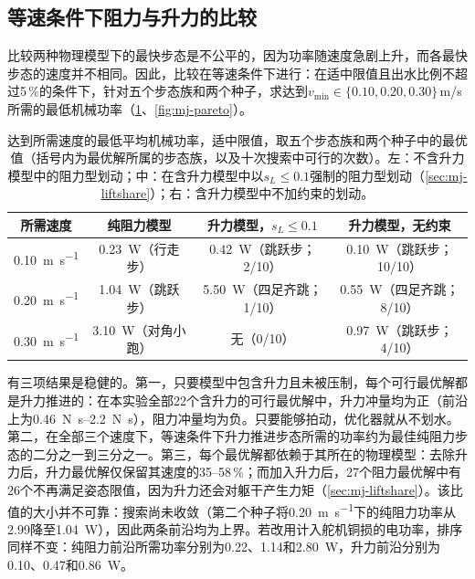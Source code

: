 \subsection{等速条件下阻力与升力的比较}

比较两种物理模型下的最快步态是不公平的，因为功率随速度急剧上升，而各最快步态的速度并不相同。因此，比较在等速条件下进行：在适中限值且出水比例不超过5\,\%的条件下，针对五个步态族和两个种子，求达到$v_\text{min}\in\{0.10,0.20,0.30\}$\,m/s所需的最低机械功率（\cref{tab:mj-pareto}、\cref{fig:mj-pareto}）。

\begin{table}[t]
  \centering
  \caption[等速下的最低功率：阻力与升力对比]{达到所需速度的最低平均机械功率，适中限值，取五个步态族和两个种子中的最优值（括号内为最优解所属的步态族，以及十次搜索中可行的次数）。左：不含升力模型中的阻力型划动；中：在含升力模型中以$s_L\le0.1$强制的阻力型划动（\cref{sec:mj-liftshare}）；右：含升力模型中不加约束的划动。}
  \label{tab:mj-pareto}
  \small
  \begin{tabular}{@{}cccc@{}}
    \toprule
    所需速度 & 纯阻力模型 & 升力模型，$s_L\le0.1$ & 升力模型，无约束 \\
    \midrule
    \SI{0.10}{\metre\per\second} & \SI{0.23}{\watt}（行走步） & \SI{0.42}{\watt}（跳跃步；2/10） & \SI{0.10}{\watt}（跳跃步；10/10） \\
    \SI{0.20}{\metre\per\second} & \SI{1.04}{\watt}（跳跃步） & \SI{5.50}{\watt}（四足齐跳；1/10） & \SI{0.55}{\watt}（四足齐跳；8/10） \\
    \SI{0.30}{\metre\per\second} & \SI{3.10}{\watt}（对角小跑） & 无（0/10） & \SI{0.97}{\watt}（跳跃步；4/10） \\
    \bottomrule
  \end{tabular}
\end{table}

有三项结果是稳健的。第一，只要模型中包含升力且未被压制，每个可行最优解都是升力推进的：在本实验全部22个含升力的可行最优解中，升力冲量均为正（前沿上为\SIrange{0.46}{2.2}{\newton\second}），阻力冲量均为负。只要能够拍动，优化器就从不划水。第二，在全部三个速度下，等速条件下升力推进步态所需的功率约为最佳纯阻力步态的二分之一到三分之一。第三，每个最优解都依赖于其所在的物理模型：去除升力后，升力最优解仅保留其速度的35--58\,\%；而加入升力后，27个阻力最优解中有26个不再满足姿态限值，因为升力还会对躯干产生力矩（\cref{sec:mj-liftshare}）。该比值的大小并不可靠：搜索尚未收敛（第二个种子将\SI{0.20}{\metre\per\second}下的纯阻力功率从2.99降至\SI{1.04}{\watt}），因此两条前沿均为上界。若改用计入舵机铜损的电功率，排序同样不变：纯阻力前沿所需功率分别为0.22、1.14和\SI{2.80}{\watt}，升力前沿分别为0.10、0.47和\SI{0.86}{\watt}。

